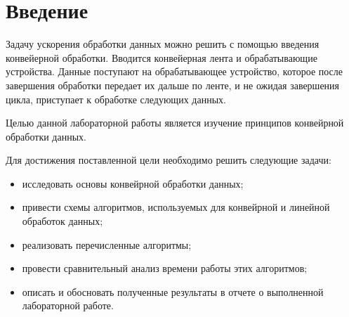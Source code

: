 \chapter*{Введение}

Задачу ускорения обработки данных можно решить с помощью введения конвейерной обработки.
Вводится конвейерная лента и обрабатывающие устройства. Данные поступают на обрабатывающее устройство, которое
после завершения обработки передает их дальше по ленте, и не ожидая завершения цикла, приступает к обработке следующих данных.

Целью данной лабораторной работы является изучение принципов конвейрной обработки данных.

Для достижения поставленной цели необходимо решить следующие задачи:

\begin{itemize}[label=---]
	\item исследовать основы конвейрной обработки данных;
	\item привести схемы алгоритмов, используемых для конвейрной и линейной обработок данных;
	\item реализовать перечисленные алгоритмы;
	\item провести сравнительный анализ времени работы этих алгоритмов;
	\item описать и обосновать полученные результаты в отчете о выполненной лабораторной работе.
\end{itemize}